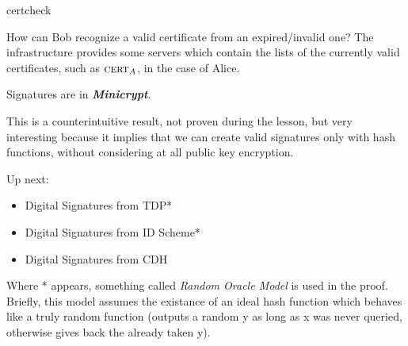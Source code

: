 \begin{cryptosequence}
    {certcheck}
    {}



    \cseqdelay


    \cseqdelay

    
    \cseqdelay


\end{cryptosequence}

How can Bob recognize a valid certificate from an expired/invalid one? The infrastructure provides some servers which contain the lists of the currently valid certificates, such as $\textsc{cert}_A$, in the case of Alice.

\begin{theorem}
    Signatures are in \textit{\textbf{Minicrypt}}.
\end{theorem}

This is a counterintuitive result, not proven during the lesson, but very interesting because it implies that we can create valid signatures only with hash functions, without considering at all public key encryption.


Up next:
\begin{itemize}
    \item Digital Signatures from TDP*
    \item Digital Signatures from ID Scheme*
    \item Digital Signatures from CDH
\end{itemize}

Where * appears, something called \textit{Random Oracle Model} is used in the proof. Briefly, this model assumes the existance of an ideal hash function which behaves like a truly random function (outputs a random y as long as x was never queried, otherwise gives back the already taken y).
